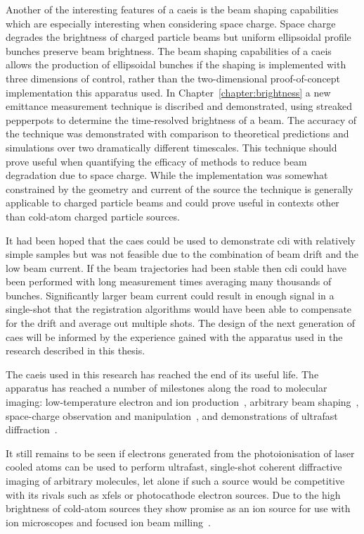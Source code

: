 Another of the interesting features of a \gls{caeis} is the beam shaping capabilities which are especially interesting when considering space charge.
Space charge degrades the brightness of charged particle beams but uniform ellipsoidal profile bunches preserve beam brightness.
The beam shaping capabilities of a \gls{caeis} allows the production of ellipsoidal bunches if the shaping is implemented with three dimensions of control, rather than the two-dimensional proof-of-concept implementation this apparatus used.
In Chapter~\ref{chapter:brightness} a new emittance measurement technique is discribed and demonstrated, using streaked pepperpots to determine the time-resolved brightness of a beam.
The accuracy of the technique was demonstrated with comparison to theoretical predictions and simulations over two dramatically different timescales.
This technique should prove useful when quantifying the efficacy of methods to reduce beam degradation due to space charge.
While the implementation was somewhat constrained by the geometry and current of the source the technique is generally applicable to charged particle beams and could prove useful in contexts other than cold-atom charged particle sources.

It had been hoped that the \gls{caes} could be used to demonstrate \gls{cdi} with relatively simple samples but was not feasible due to the combination of beam drift and the low beam current.
If the beam trajectories had been stable then \gls{cdi} could have been performed with long measurement times averaging many thousands of bunches.
Significantly larger beam current could result in enough signal in a single-shot that the registration algorithms would have been able to compensate for the drift and average out multiple shots.
The design of the next generation of \gls{caes} will be informed by the experience gained with the apparatus used in the research described in this thesis.

The \gls{caeis} used in this research has reached the end of its useful life.
The apparatus has reached a number of milestones along the road to molecular imaging: low-temperature electron and ion production~\cite{saliba_spatial_2012,mcculloch_high-coherence_2013,mcculloch_field_2017,speirs_identification_2017}, arbitrary beam shaping~\cite{mcculloch_arbitrarily_2011}, space-charge observation and manipulation~\cite{murphy_detailed_2014,murphy_increasing_2015,thompson_suppression_2016}, and demonstrations of ultrafast diffraction~\cite{speirs_single-shot_2015}.

It still remains to be seen if electrons generated from the photoionisation of laser cooled atoms can be used to perform ultrafast, single-shot coherent diffractive imaging of arbitrary molecules, let alone if such a source would be competitive with its rivals such as \glspl{xfel} or photocathode electron sources.
Due to the high brightness of cold-atom sources they show promise as an ion source for use with ion microscopes and focused ion beam milling~\cite{steele_high-brightness_2017}.

